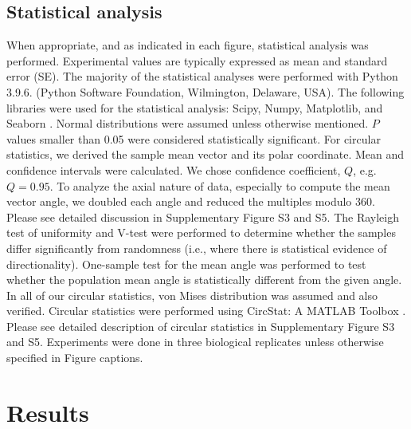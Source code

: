 \documentclass[review]{elsarticle}
\begin{document}
\subsection{Statistical analysis}
When appropriate, and as indicated in each figure, statistical analysis was performed. Experimental values are typically expressed as mean and standard error (SE). The majority of the statistical analyses were performed with Python 3.9.6. (Python Software Foundation, Wilmington, Delaware, USA). The following libraries were used for the statistical analysis: Scipy, Numpy, Matplotlib, and Seaborn \cite{5725236, hunter2007,Virtanen2020}. Normal distributions were assumed unless otherwise mentioned. $P$ values smaller than 0.05 were considered statistically significant. For circular statistics, we derived the sample mean vector and its polar coordinate. Mean and confidence intervals were calculated. We chose confidence coefficient, $Q$, e.g. $Q = 0.95$. To analyze the axial nature of data, especially to compute the mean vector angle, we doubled each angle and reduced the multiples modulo 360\degree. Please see detailed discussion in Supplementary Figure S3 and S5. The Rayleigh test of uniformity and V-test were performed to determine whether the samples differ significantly from randomness (i.e., where there is statistical evidence of directionality). One-sample test for the mean angle was performed to test whether the population mean angle is statistically different from the given angle. In all of our circular statistics, von Mises distribution was assumed and also verified. Circular statistics were performed using CircStat: A MATLAB Toolbox \cite{Berens2009, Berens2009a}. Please see detailed description of circular statistics in Supplementary Figure S3 and S5. Experiments were done in three biological replicates unless otherwise specified in Figure captions.



\section{Results}
\end{document}
